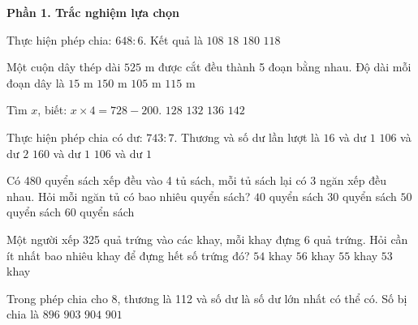 \textbf{Phần 1. Trắc nghiệm lựa chọn}

\begin{ex} %
Thực hiện phép chia: $648 : 6$. Kết quả là
\choice
{\True $108$}
{$18$}
{$180$}
{$118$}
\end{ex}

\begin{ex} %
Một cuộn dây thép dài $525\text{ m}$ được cắt đều thành 5 đoạn bằng nhau. Độ dài mỗi đoạn dây là
\choice
{$15\text{ m}$}
{$150\text{ m}$}
{\True $105\text{ m}$}
{$115\text{ m}$}
\end{ex}

\begin{ex} %
Tìm $x$, biết: $x \times 4 = 728 - 200$.
\choice
{$128$}
{\True $132$}
{$136$}
{$142$}
\end{ex}

\begin{ex} %
Thực hiện phép chia có dư: $743 : 7$. Thương và số dư lần lượt là
\choice
{$16$ và dư $1$}
{$106$ và dư $2$}
{$160$ và dư $1$}
{\True $106$ và dư $1$}
\end{ex}

\begin{ex} %
Có 480 quyển sách xếp đều vào 4 tủ sách, mỗi tủ sách lại có 3 ngăn xếp đều nhau. Hỏi mỗi ngăn tủ có bao nhiêu quyển sách?
\choice
{\True $40$ quyển sách}
{$30$ quyển sách}
{$50$ quyển sách}
{$60$ quyển sách}
\end{ex}

\begin{ex} %
Một người xếp 325 quả trứng vào các khay, mỗi khay đựng 6 quả trứng. Hỏi cần ít nhất bao nhiêu khay để đựng hết số trứng đó?
\choice
{$54$ khay}
{$56$ khay}
{\True $55$ khay}
{$53$ khay}
\end{ex}

\begin{ex} %
Trong phép chia cho 8, thương là 112 và số dư là số dư lớn nhất có thể có. Số bị chia là
\choice
{$896$}
{\True $903$}
{$904$}
{$901$}
\end{ex}

